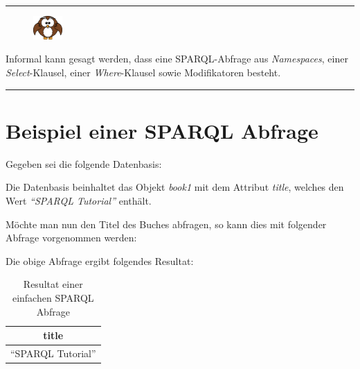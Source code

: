 \noindent\rule[1ex]{\textwidth}{1pt}
\begin{figure}
    \vspace{-21pt}
    \includegraphics[width=0.1\textwidth]{bilder/owl.png}
\end{figure}
Informal kann gesagt werden, dass eine SPARQL-Abfrage aus \textit{Namespaces}, einer \textit{Select}-Klausel, einer \textit{Where}-Klausel sowie Modifikatoren besteht.

\noindent\rule[1ex]{\textwidth}{1pt}

\section{Beispiel einer SPARQL Abfrage}
\label{sec:sparql_beispiel}

Gegeben sei die folgende Datenbasis:
\lstset{language=XML}

Die Datenbasis beinhaltet das Objekt \textit{book1} mit dem Attribut \textit{title}, welches den Wert \textit{``SPARQL Tutorial''} enthält.

Möchte man nun den Titel des Buches abfragen, so kann dies mit folgender Abfrage vorgenommen werden:

Die obige Abfrage ergibt folgendes Resultat:
\noindent\hspace*{15mm}
\begin{table}[h]
    \centering
    \begin{tabular}{|l|}
        \hline
        \multicolumn{1}{|c|}{\textbf{title}} \\ \hline
        ``SPARQL Tutorial''                    \\ \hline
    \end{tabular}
    \caption{Resultat einer einfachen SPARQL Abfrage\protect\footnotemark}
\end{table}

